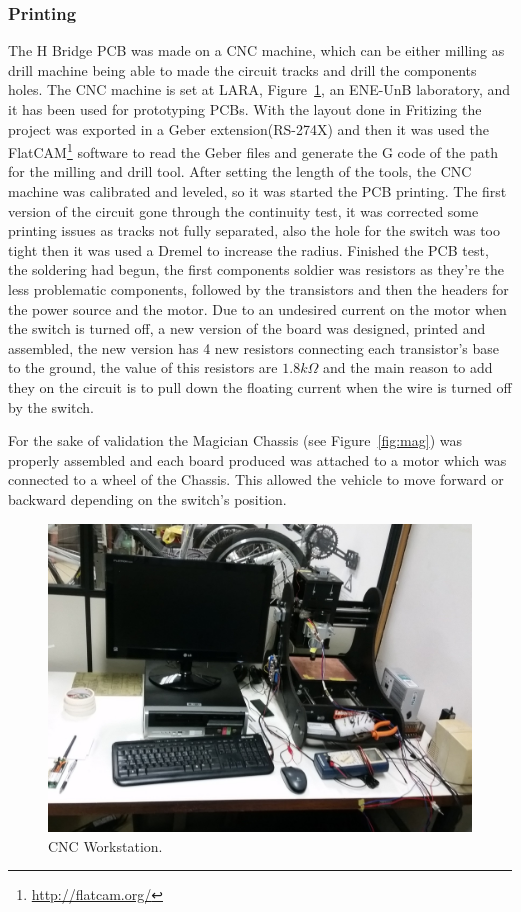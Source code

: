     \subsubsection{Printing} %
    \label{ssub:printing}
        The H Bridge PCB was made on a CNC machine, which can be either milling as drill machine being able to made the circuit tracks and drill the components holes. The CNC machine is set at LARA, Figure~\ref{fig:workstation}, an ENE-UnB laboratory, and it has been used for prototyping PCBs. With the layout done in Fritizing the project was exported in a Geber extension(RS-274X) and then it was used the FlatCAM\footnote{\url{http://flatcam.org/}} software to read the Geber files and generate the G code of the path for the milling and drill tool. After setting the length of the tools, the CNC machine was calibrated and leveled, so it was started the PCB printing. The first version of the circuit gone through the continuity test, it was corrected some printing issues as tracks not fully separated, also the hole for the switch was too tight then it was used a Dremel to increase the radius. Finished the PCB test, the soldering had begun, the first components soldier was resistors as they're the less problematic components, followed by the transistors and then the headers for the power source and the motor. Due to an undesired current on the motor when the switch is turned off, a new version of the board was designed, printed and assembled, the new version has 4 new resistors connecting each transistor's base to the ground, the value of this resistors are $1.8k\Omega$ and the main reason to add they on the circuit is to pull down the floating current when the wire is turned off by the switch.
	
	For the sake of validation the Magician Chassis (see Figure~\ref{fig:mag}) was properly assembled and each board produced was attached to a motor which was connected to a wheel of the Chassis. This allowed the vehicle to move forward or backward depending on the switch's position.

\begin{figure}
\centering
\centering%
\includegraphics[height=.35\textwidth]{img/workstation_cnc.jpg}
\caption{CNC Workstation.}
\label{fig:workstation}%
\end{figure}

